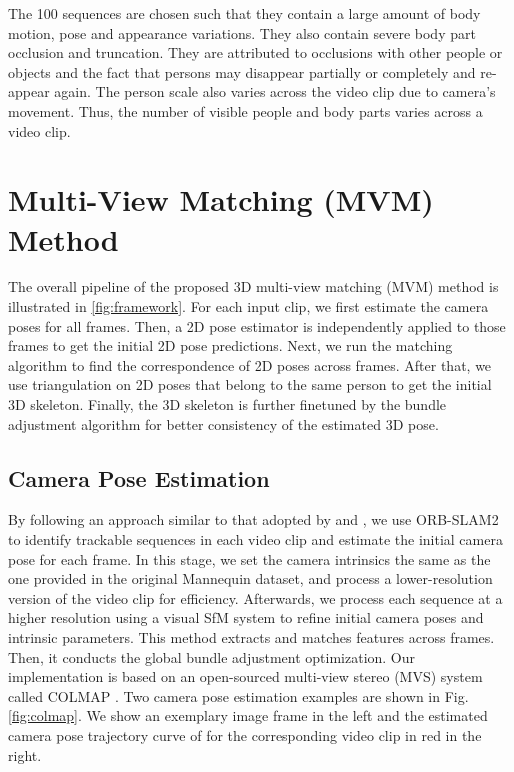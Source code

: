 \documentclass{article}
\begin{document}
The 100 sequences are chosen such that they contain a large amount of
body motion, pose and appearance variations. They also contain severe
body part occlusion and truncation. They are attributed to occlusions
with other people or objects and the fact that persons may disappear
partially or completely and re-appear again. The person scale also
varies across the video clip due to camera's movement. Thus, the number
of visible people and body parts varies across a video clip. 

\section{Multi-View Matching (MVM) Method}\label{sec:method-1}

The overall pipeline of the proposed 3D multi-view matching (MVM) method
is illustrated in \ref{fig:framework}. For each input clip, we first
estimate the camera poses for all frames. Then, a 2D pose estimator is
independently applied to those frames to get the initial 2D pose
predictions. Next, we run the matching algorithm to find the
correspondence of 2D poses across frames. After that, we use
triangulation on 2D poses that belong to the same person to get the
initial 3D skeleton. Finally, the 3D skeleton is further finetuned by
the bundle adjustment algorithm for better consistency of the estimated
3D pose. 

\subsection{Camera Pose Estimation} 

By following an approach similar to that adopted by
\cite{li2019learning} and \cite{zhou2018stereo}, we use ORB-SLAM2
\cite{mur2017orb} to identify trackable sequences in each video clip and
estimate the initial camera pose for each frame. In this stage, we set
the camera intrinsics the same as the one provided in the original
Mannequin dataset, and process a lower-resolution version of
the video clip for efficiency. Afterwards, we process each sequence at a
higher resolution using a visual SfM system
\cite{schonberger2016structure} to refine initial camera poses and
intrinsic parameters. This method extracts and matches features across
frames. Then, it conducts the global bundle adjustment optimization.
Our implementation is based on an open-sourced multi-view stereo (MVS)
system called COLMAP \cite{schonberger2016pixelwise}. Two camera pose
estimation examples are shown in Fig. \ref{fig:colmap}. We show an
exemplary image frame in the left and the estimated camera pose
trajectory curve of for the corresponding video clip in red in the
right. 
\end{document}
